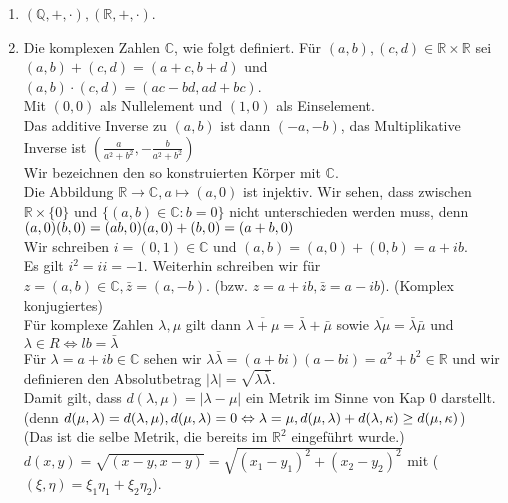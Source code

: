\documentclass{scrartcl}
\newcommand{\lb}{\lambda}
\newcommand{\R}{\mathbb{R}}
\newcommand{\Q}{\mathbb{Q}}
\newcommand{\C}{\mathbb{C}}
\begin{document}
\begin{enumerate}
\item{\((\Q, +, \cdot), (\R, +, \cdot)\).}
\item{Die komplexen Zahlen \(\C\), wie folgt definiert. F\"ur \((a, b), (c, d) \in \R \times \R\) sei\\
\((a, b)+(c, d) = (a + c, b + d)\) und\\
\((a,b)\cdot (c,d) = (ac-bd, ad + bc)\).\\
Mit \((0, 0)\) als Nullelement und \((1, 0)\) als Einselement.\\
Das additive Inverse zu \((a, b)\) ist dann \((-a, -b)\), das Multiplikative Inverse ist \((\frac{a}{a^2+b^2}, -\frac{b}{a^2 + b^2})\)\\
Wir bezeichnen den so konstruierten K\"orper mit \(\C\).\\
Die Abbildung \(\R \to \C, a \mapsto (a, 0)\) ist injektiv. Wir sehen, dass zwischen \(\R \times \{0\}\) und \(\{(a, b) \in \C : b = 0\}\) nicht unterschieden werden muss, denn \\
\(
(a, 0) (b, 0) = (ab, 0)\\
(a, 0) + (b, 0) = (a+b, 0)
\)\\
Wir schreiben \(i = (0, 1) \in \C\) und \((a, b) = (a, 0) + (0, b) = a + ib\).\\
Es gilt \(i^2 = ii = -1\). Weiterhin schreiben wir  f\"ur \(z = (a, b) \in \C, \bar{z} = (a, -b)\). (bzw. \(z = a + ib, \bar{z} = a - ib\)). (Komplex konjugiertes)\\
F\"ur komplexe Zahlen \(\lb, \mu\) gilt dann \(\overline{\lb + \mu} = \bar{\lb} + \bar{\mu}\) sowie \(\overline{\lb \mu} = \bar{\lb}\bar{\mu}\) und \(\lb \in R \Leftrightarrow lb = \bar{\lb}\)\\
F\"ur \(\lb = a+ib \in \C\) sehen wir \(\lb \bar{\lb} = (a + bi) (a - bi) = a^2 + b^2 \in \R\) und wir definieren den Absolutbetrag \(|\lb| = \sqrt{\lb \bar{\lb}}\).\\
Damit gilt, dass \(d(\lb, \mu) = |\lb - \mu|\) ein Metrik im Sinne von Kap 0 darstellt. (denn \(d(\mu, \lb) = d(\lb, \mu),\\
d(\mu, \lb) = 0 \Leftrightarrow \lb = \mu,\\
d(\mu, \lb) + d(\lb, \kappa) \ge d(\mu, \kappa)\))\\
(Das ist die selbe Metrik, die bereits im \(\R^2\) eingef\"uhrt wurde.)\\
\(d(x, y) = \sqrt{(x - y, x - y)} = \sqrt{(x_1-y_1)^2 + (x_2 - y_2)^2}\) mit (\((\xi, \eta) = \xi_1 \eta_1 + \xi_2 \eta_2\)).\\
}
\end{enumerate}
\end{document}
